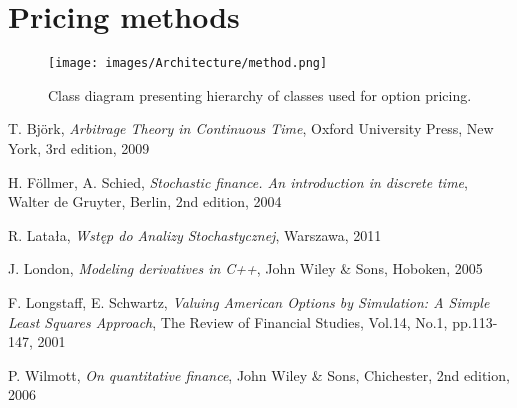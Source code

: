 \documentclass[a4paper,12pt, oneside]{book}
\theoremstyle{definition}
\theoremstyle{remark}
\begin{document}
\section{Pricing methods}
\begin{sidewaysfigure}
\centering
 \texttt{[image: images/Architecture/method.png]}
\caption{Class diagram presenting hierarchy of classes used for option pricing.}
\label{fig:arch:method}
\end{sidewaysfigure}
	
\begin{thebibliography}{99}

T. Bj\"{o}rk, \emph{Arbitrage Theory in Continuous Time}, Oxford University Press,  New York, 3rd edition, 2009

H. F\"{o}llmer, A. Schied, \emph{Stochastic finance. An introduction in discrete time}, Walter de Gruyter, Berlin, 2nd edition, 2004

R. Latała, \emph{Wstęp do Analizy Stochastycznej}, Warszawa, 2011

J. London, \emph{Modeling derivatives in C++}, John Wiley \& Sons, Hoboken, 2005

F. Longstaff, E. Schwartz, \emph{Valuing American Options by Simulation: A Simple Least Squares Approach}, The Review of Financial Studies, Vol.14, No.1, pp.113-147, 2001

P. Wilmott, \emph{On quantitative finance}, John Wiley \& Sons, Chichester, 2nd edition, 2006

\end{thebibliography}
\end{document}
